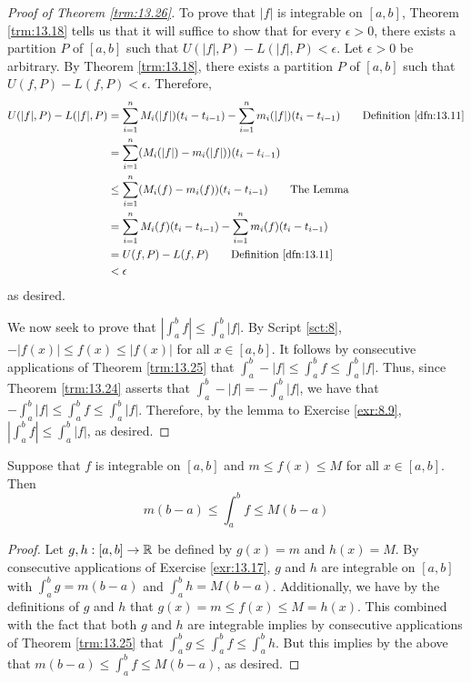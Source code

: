 \documentclass[../main.tex]{subfiles}
\begin{document}
\begin{theorem}
\begin{proof}[Proof of Theorem \ref{trm:13.26}]
        To prove that $|f|$ is integrable on $[a,b]$, Theorem \ref{trm:13.18} tells us that it will suffice to show that for every $\epsilon>0$, there exists a partition $P$ of $[a,b]$ such that $U(|f|,P)-L(|f|,P)<\epsilon$. Let $\epsilon>0$ be arbitrary. By Theorem \ref{trm:13.18}, there exists a partition $P$ of $[a,b]$ such that $U(f,P)-L(f,P)<\epsilon$. Therefore,
        \begin{align*}
            U(|f|,P)-L(|f|,P) &= \sum_{i=1}^nM_i(|f|)(t_i-t_{i-1})-\sum_{i=1}^nm_i(|f|)(t_i-t_{i-1})\tag*{Definition \ref{dfn:13.11}}\\
            &= \sum_{i=1}^n(M_i(|f|)-m_i(|f|))(t_i-t_{i-1})\\
            &\leq \sum_{i=1}^n(M_i(f)-m_i(f))(t_i-t_{i-1})\tag*{The Lemma}\\
            &= \sum_{i=1}^nM_i(f)(t_i-t_{i-1})-\sum_{i=1}^nm_i(f)(t_i-t_{i-1})\\
            &= U(f,P)-L(f,P)\tag*{Definition \ref{dfn:13.11}}\\
            &< \epsilon
        \end{align*}
        as desired.\par
        We now seek to prove that $|\int_a^bf|\leq\int_a^b|f|$. By Script \ref{sct:8}, $-|f(x)|\leq f(x)\leq |f(x)|$ for all $x\in[a,b]$. It follows by consecutive applications of Theorem \ref{trm:13.25} that $\int_a^b-|f|\leq\int_a^bf\leq\int_a^b|f|$. Thus, since Theorem \ref{trm:13.24} asserts that $\int_a^b-|f|=-\int_a^b|f|$, we have that $-\int_a^b|f|\leq\int_a^bf\leq\int_a^b|f|$. Therefore, by the lemma to Exercise \ref{exr:8.9}, $|\int_a^bf|\leq\int_a^b|f|$, as desired.
    \end{proof}
\end{theorem}

\begin{theorem}\label{trm:13.27}
    Suppose that $f$ is integrable on $[a,b]$ and $m\leq f(x)\leq M$ for all $x\in[a,b]$. Then
    \begin{equation*}
        m(b-a) \leq \int_a^bf \leq M(b-a)
    \end{equation*}
    \begin{proof}
        Let $g,h:[a,b]\to\mathbb{R}$ be defined by $g(x)=m$ and $h(x)=M$. By consecutive applications of Exercise \ref{exr:13.17}, $g$ and $h$ are integrable on $[a,b]$ with $\int_a^bg=m(b-a)$ and $\int_a^bh=M(b-a)$. Additionally, we have by the definitions of $g$ and $h$ that $g(x)=m\leq f(x)\leq M=h(x)$. This combined with the fact that both $g$ and $h$ are integrable implies by consecutive applications of Theorem \ref{trm:13.25} that $\int_a^bg\leq\int_a^bf\leq\int_a^bh$. But this implies by the above that $m(b-a)\leq\int_a^bf\leq M(b-a)$, as desired.
    \end{proof}
\end{theorem}
\end{document}
